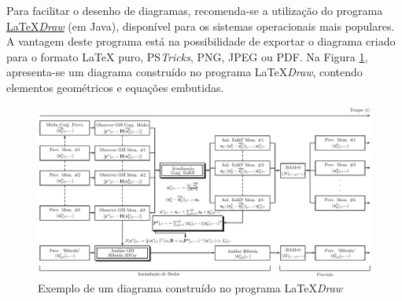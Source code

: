 %
%

Para facilitar o desenho de diagramas, recomenda-se a utilização do programa \href{http://latexdraw.sourceforge.net}{\LaTeX\textit{Draw}} (em Java), disponível para os sistemas operacionais mais populares. A vantagem deste programa está na possibilidade de exportar o diagrama criado para o formato \LaTeX{} puro, PS\textit{Tricks}, PNG, JPEG ou PDF. Na Figura \ref{fig:ciclo}, apresenta-se um diagrama construído no programa \LaTeX{}\textit{Draw}, contendo elementos geométricos e equações embutidas.

\begin{figure}[H]
\caption{Exemplo de um diagrama construído no programa \LaTeX\textit{Draw}}
\vspace{6mm}
    \begin{center}
        \includegraphics[width=\textwidth]{./docs/figs/diagrama_hibrido_novo_pt-tempos.pdf}
    \end{center}
\vspace{4mm}
\label{fig:ciclo}
\end{figure}

